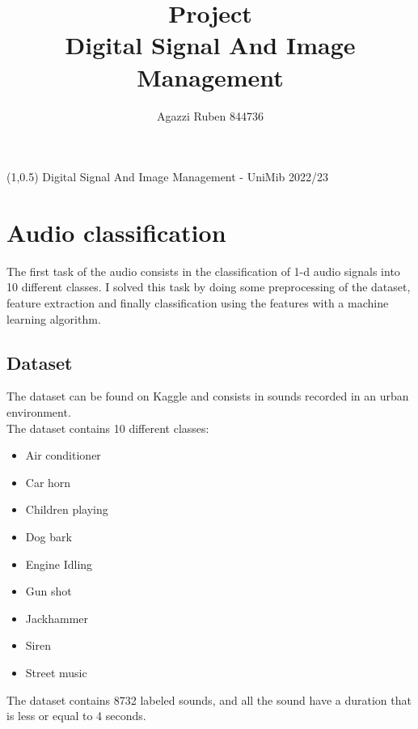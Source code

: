 \documentclass[12pt,journal,compsoc]{IEEEtran}
\begin{document}
\begin{textblock}{5}(1,0.5)
\noindent\small Digital Signal And Image Management - UniMib 2022/23
\end{textblock}

\title{Project\\
\vspace{2mm}\large{Digital Signal And Image Management}}
\author{Agazzi Ruben 844736}


\maketitle
\IEEEpeerreviewmaketitle
\IEEEdisplaynontitleabstractindextext

\tableofcontents


\section{Audio classification}
The first task of the audio consists in the classification of 1-d audio signals into 10 different classes. I solved this task by doing some preprocessing of the dataset, feature extraction and finally classification using the features with a machine learning algorithm.
\subsection{Dataset}
The dataset can be found on Kaggle and consists in sounds recorded in an urban environment.\\
The dataset contains 10 different classes:
\begin{itemize}
	\item Air conditioner
	\item Car horn
	\item Children playing
	\item Dog bark
	\item Engine Idling
	\item Gun shot
	\item Jackhammer
	\item Siren
	\item Street music
\end{itemize}
The dataset contains 8732 labeled sounds, and all the sound have a duration that is less or equal to 4 seconds.
\end{document}

